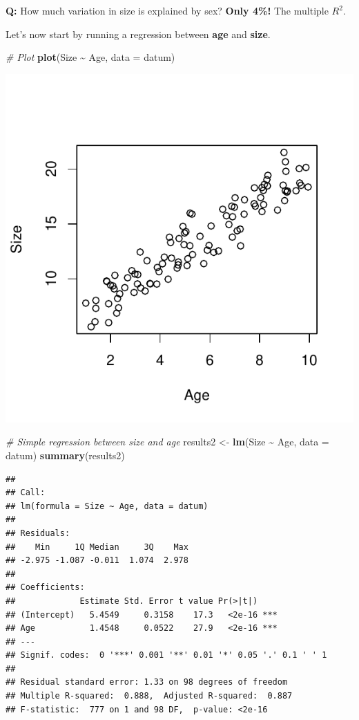 \documentclass[
]{article}
\newenvironment{Shaded}{\begin{snugshade}}{\end{snugshade}}
\newcommand{\AttributeTok}[1]{\textcolor[rgb]{0.13,0.29,0.53}{#1}}
\newcommand{\CommentTok}[1]{\textcolor[rgb]{0.56,0.35,0.01}{\textit{#1}}}
\newcommand{\FunctionTok}[1]{\textcolor[rgb]{0.13,0.29,0.53}{\textbf{#1}}}
\newcommand{\NormalTok}[1]{#1}
\newcommand{\OtherTok}[1]{\textcolor[rgb]{0.56,0.35,0.01}{#1}}
\newcommand{\SpecialCharTok}[1]{\textcolor[rgb]{0.81,0.36,0.00}{\textbf{#1}}}
\begin{document}
\textbf{Q:} How much variation in size is explained by sex? \textbf{Only
4\%!} The multiple \(R^2\).

Let's now start by running a regression between \textbf{age} and
\textbf{size}.

\begin{Shaded}
\begin{Highlighting}[]
\CommentTok{\# Plot}
\FunctionTok{plot}\NormalTok{(Size }\SpecialCharTok{\textasciitilde{}}\NormalTok{ Age, }\AttributeTok{data =}\NormalTok{ datum)}
\end{Highlighting}
\end{Shaded}

\includegraphics{lecture_12_files/figure-latex/analysis_5-1.pdf}

\begin{Shaded}
\begin{Highlighting}[]
\CommentTok{\# Simple regression between size and age }
\NormalTok{results2 }\OtherTok{\textless{}{-}} \FunctionTok{lm}\NormalTok{(Size }\SpecialCharTok{\textasciitilde{}}\NormalTok{ Age, }\AttributeTok{data =}\NormalTok{ datum)}
\FunctionTok{summary}\NormalTok{(results2)}
\end{Highlighting}
\end{Shaded}

\begin{verbatim}
## 
## Call:
## lm(formula = Size ~ Age, data = datum)
## 
## Residuals:
##    Min     1Q Median     3Q    Max 
## -2.975 -1.087 -0.011  1.074  2.978 
## 
## Coefficients:
##             Estimate Std. Error t value Pr(>|t|)    
## (Intercept)   5.4549     0.3158    17.3   <2e-16 ***
## Age           1.4548     0.0522    27.9   <2e-16 ***
## ---
## Signif. codes:  0 '***' 0.001 '**' 0.01 '*' 0.05 '.' 0.1 ' ' 1
## 
## Residual standard error: 1.33 on 98 degrees of freedom
## Multiple R-squared:  0.888,  Adjusted R-squared:  0.887 
## F-statistic:  777 on 1 and 98 DF,  p-value: <2e-16
\end{verbatim}
\end{document}
